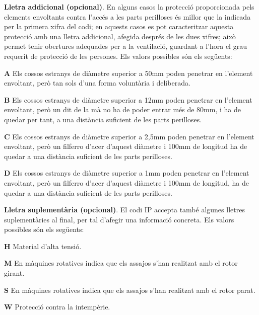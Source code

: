 \textbf{Lletra addicional (opcional)}. En alguns casos la protecci\'{o}
proporcionada pels elements envoltants contra l'acc\'{e}s a les parts
perilloses \'{e}s millor que la indicada per la primera xifra del codi;
en aquests casos es pot caracteritzar aquesta protecci\'{o} amb una
lletra addicional, afegida despr\'{e}s de les dues xifres; aix\`{o} permet
tenir obertures adequades per a la ventilaci\'{o},  guardant a l'hora el
grau requerit de protecci\'{o} de les persones. Els valors possibles s\'{o}n
els seg\"{u}ents:
\begin{list}{}
   {\setlength{\labelwidth}{10mm} \setlength{\leftmargin}{10mm} \setlength{\labelsep}{2mm}}
   \item[\textbf{A}] Els  cossos estranys de di\`{a}metre superior a
   50\unit{mm}    poden penetrar en l'element envoltant, per\`{o} tan sols d'una forma volunt\`{a}ria i deliberada.
   \item[\textbf{B}] Els  cossos estranys de di\`{a}metre superior a 12\unit{mm}
    poden penetrar en l'element envoltant, per\`{o} un dit de la m\`{a} no ha de poder entrar m\'{e}s de 80\unit{mm}, i
    ha de quedar per tant, a una dist\`{a}ncia    suficient de les parts perilloses.
   \item[\textbf{C}] Els  cossos estranys de di\`{a}metre superior a 2,5\unit{mm}
   poden penetrar en l'element envoltant, per\`{o} un filferro d'acer d'aquest di\`{a}metre i 100\unit{mm}
   de longitud ha de quedar a una dist\`{a}ncia suficient de les parts perilloses.
   \item[\textbf{D}] Els  cossos estranys de di\`{a}metre superior a 1\unit{mm}
   poden penetrar en l'element envoltant, per\`{o} un filferro d'acer d'aquest di\`{a}metre i 100\unit{mm}
   de longitud, ha de quedar a una dist\`{a}ncia suficient de les parts perilloses.
\end{list}

\textbf{Lletra suplement\`{a}ria (opcional)}. El codi \textsf{IP} accepta tamb\'{e} algunes
lletres suplement\`{a}ries al final, per tal d'afegir una informaci\'{o} concreta. Els valors
possibles s\'{o}n els seg\"{u}ents:
\begin{list}{}
   {\setlength{\labelwidth}{10mm} \setlength{\leftmargin}{10mm} \setlength{\labelsep}{2mm}}
   \item[\textbf{H}] Material d'alta tensi\'{o}.
   \item[\textbf{M}] En m\`{a}quines rotatives indica que els assajos s'han realitzat amb el
    rotor girant.
   \item[\textbf{S}] En m\`{a}quines rotatives indica que els assajos s'han realitzat amb el
    rotor parat.
   \item[\textbf{W}] Protecci\'{o} contra la intemp\`{e}rie.
\end{list}



